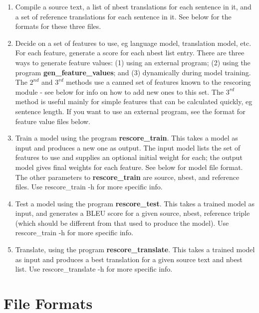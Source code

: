 \documentclass[12pt]{amsart}
\begin{document}
\begin{enumerate}
\item
  Compile a source text, a list of nbest translations for each sentence in it,
  and a set of reference translations for each sentence in it. See below for
  the formats for these three files.

\item
  Decide on a set of features to use, eg language model, translation model,
  etc. For each feature, generate a score for each nbest list entry.  There are
  three ways to generate feature values: (1) using an external program; (2)
  using the program \textbf{gen\_feature\_values}; and (3) dynamically during
  model training.  The $2^{nd}$ and $3^{rd}$ methods use a canned set of
  features known to the rescoring module - see below for info on how to add new
  ones to this set.  The $3^{rd}$ method is useful mainly for simple features
  that can be calculated quickly, eg sentence length.  If you want to use an
  external program, see the format for feature value files below.

\item
  Train a model using the program \textbf{rescore\_train}.  This takes a model
  as input and produces a new one as output.  The input model lists the set of
  features to use and supplies an optional initial weight for each; the output
  model gives final weights for each feature. See below for model file format.
  The other parameters to \textbf{rescore\_train} are source, nbest, and
  reference files.  Use rescore\_train -h for more specific info.

\item
  Test a model using the program \textbf{rescore\_test}.  This takes a trained
  model as input, and generates a BLEU score for a given source, nbest,
  reference triple (which should be different from that used to produce the
  model).  Use rescore\_train -h for more specific info.

\item
  Translate, using the program \textbf{rescore\_translate}.  This takes a
  trained model as input and produces a best translation for a given source
  text and nbest list.  Use rescore\_translate -h for more specific info.

\end{enumerate}

\section*{File Formats}
\end{document}
